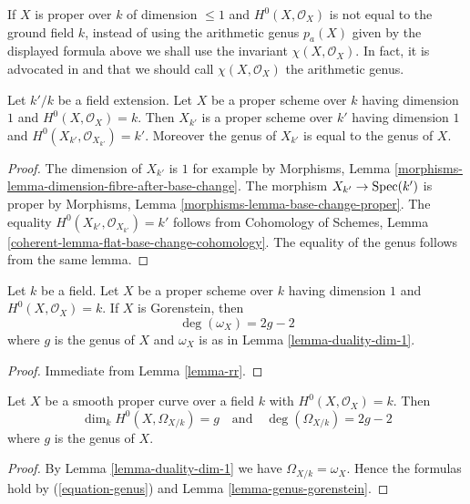 \medskip\noindent
If $X$ is proper over $k$ of dimension $\leq 1$ and $H^0(X, \mathcal{O}_X)$
is not equal to the ground field $k$, instead of using the arithmetic genus
$p_a(X)$ given by the displayed formula above we shall use the invariant
$\chi(X, \mathcal{O}_X)$. In fact, it is advocated in
\cite[page 276]{FAC} and \cite[Introduction]{Hirzebruch}
that we should call $\chi(X, \mathcal{O}_X)$ the arithmetic genus.

\begin{lemma}
\label{lemma-genus-base-change}
Let $k'/k$ be a field extension. Let $X$ be a proper scheme over $k$ having
dimension $1$ and $H^0(X, \mathcal{O}_X) = k$. Then $X_{k'}$ is a
proper scheme over $k'$
having dimension $1$ and $H^0(X_{k'}, \mathcal{O}_{X_{k'}}) = k'$.
Moreover the genus of $X_{k'}$ is equal to the genus of $X$.
\end{lemma}

\begin{proof}
The dimension of $X_{k'}$ is $1$ for example by
Morphisms, Lemma \ref{morphisms-lemma-dimension-fibre-after-base-change}.
The morphism $X_{k'} \to \mathop{\mathrm{Spec}}(k')$ is proper by
Morphisms, Lemma \ref{morphisms-lemma-base-change-proper}.
The equality $H^0(X_{k'}, \mathcal{O}_{X_{k'}}) = k'$ follows from
Cohomology of Schemes, Lemma
\ref{coherent-lemma-flat-base-change-cohomology}.
The equality of the genus follows from the same lemma.
\end{proof}

\begin{lemma}
\label{lemma-genus-gorenstein}
Let $k$ be a field. Let $X$ be a proper scheme over $k$ having
dimension $1$ and $H^0(X, \mathcal{O}_X) = k$. If $X$ is Gorenstein,
then
$$
\deg(\omega_X) = 2g - 2
$$
where $g$ is the genus of $X$ and $\omega_X$ is as in
Lemma \ref{lemma-duality-dim-1}.
\end{lemma}

\begin{proof}
Immediate from Lemma \ref{lemma-rr}.
\end{proof}

\begin{lemma}
\label{lemma-genus-smooth}
Let $X$ be a smooth proper curve over a field $k$
with $H^0(X, \mathcal{O}_X) = k$. Then
$$
\dim_k H^0(X, \Omega_{X/k}) = g
\quad\text{and}\quad
\deg(\Omega_{X/k}) = 2g - 2
$$
where $g$ is the genus of $X$.
\end{lemma}

\begin{proof}
By Lemma \ref{lemma-duality-dim-1} we have $\Omega_{X/k} = \omega_X$.
Hence the formulas hold by (\ref{equation-genus}) and
Lemma \ref{lemma-genus-gorenstein}.
\end{proof}






